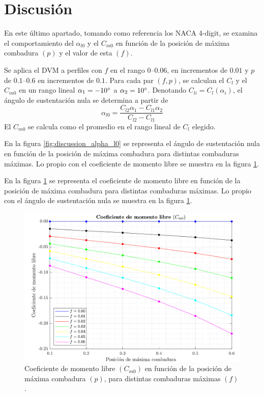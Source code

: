 
\section{Discusión}

En este último apartado, tomando como referencia los NACA 4-digit, se examina el comportamiento del $\alpha_{l0}$ y el $C_{m0}$ en función de la posición de máxima combadura $\left( p \right)$ y el valor de esta $\left( f \right)$.

Se aplica el DVM a perfiles con $f$ en el rango $0$--$0.06$, en incrementos de $0.01$ y $p$ de $0.1$--$0.6$ en incrementos de $0.1$. Para cada par $\left( f, p \right)$, se calculan el $C_l$ y el $C_{m0}$ en un rango lineal $\alpha_{1} = -10\mathrm{^{\circ}}$ a $\alpha_{2} = 10\mathrm{^{\circ}}$. Denotando $C_{li} = C_l\left( \alpha_i \right)$, el ángulo de sustentación nula se determina a partir de
\begin{equation}
    \alpha_{l0} = \frac{C_{l2} \alpha_1 - C_{l1} \alpha_2}{C_{l2} - C_{l1}}
\end{equation}
El $C_{m0}$ se calcula como el promedio en el rango lineal de $C_l$ elegido.

En la figura \ref{fig:discussion_alpha_l0} se representa el ángulo de sustentación nula en función de la posición de máxima combadura para distintas combaduras máximas. Lo propio con el coeficiente de momento libre se muestra en la figura \ref{fig:discussion_cm0}.

En la figura \ref{fig:discussion_cm0} se representa el coeficiente de momento libre en función de la posición de máxima combadura para distintas combaduras máximas. Lo propio con el ángulo de sustentación nula se muestra en la figura \ref{fig:discussion_cm0}.

\begin{figure}[ht] 
    \centering
    \includegraphics[width=\linewidth]{imagenes/discusion/discussion_cm0.pdf}
    \caption{Coeficiente de momento libre $\left( C_{m0} \right)$ en función de la posición de máxima combadura $\left( p \right)$, para distintas combaduras máximas $\left( f \right)$.}
    \label{fig:discussion_cm0}
\end{figure}

